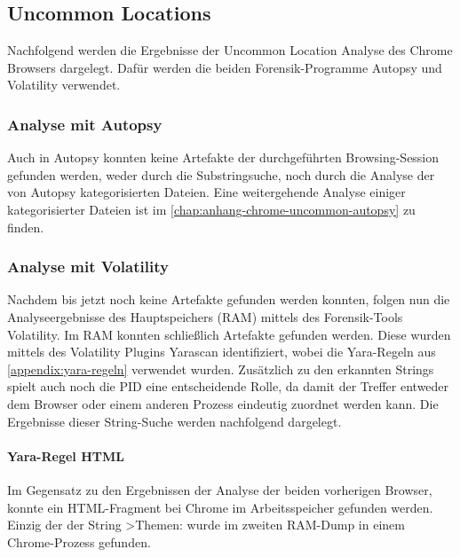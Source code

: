 \subsection*{Uncommon Locations}\label{chap:ergebnisse-chrome-uncommon-locations}

Nachfolgend werden die Ergebnisse der Uncommon Location Analyse des Chrome Browsers dargelegt. Dafür werden die beiden Forensik-Programme Autopsy und Volatility verwendet.

\subsubsection*{Analyse mit Autopsy}\label{chap:ergebnisse-chrome-uncommon-autopsy}

Auch in Autopsy konnten keine Artefakte der durchgeführten Browsing-Session gefunden werden, weder durch die Substringsuche, noch durch die Analyse der von Autopsy kategorisierten Dateien. Eine weitergehende Analyse einiger kategorisierter Dateien ist im \autoref{chap:anhang-chrome-uncommon-autopsy} zu finden.

\subsubsection*{Analyse mit Volatility}\label{chap:ergebnisse-chrome-uncommon-volatility}

Nachdem bis jetzt noch keine Artefakte gefunden werden konnten, folgen nun die Analyseergebnisse des Hauptspeichers (RAM) mittels des Forensik-Tools Volatility. Im RAM konnten schließlich Artefakte gefunden werden. Diese wurden mittels des Volatility Plugins Yarascan identifiziert, wobei die Yara-Regeln aus \autoref{appendix:yara-regeln} verwendet wurden. Zusätzlich zu den erkannten Strings spielt auch noch die PID eine entscheidende Rolle, da damit der Treffer entweder dem Browser oder einem anderen Prozess eindeutig zuordnet werden kann. Die Ergebnisse dieser String-Suche werden nachfolgend dargelegt.

\paragraph*{Yara-Regel \glqq{}HTML\grqq{}}\label{chap:ergebnisse-chrome-uncommon-volatility-html}

Im Gegensatz zu den Ergebnissen der Analyse der beiden vorherigen Browser, konnte ein HTML-Fragment bei Chrome im Arbeitsspeicher gefunden werden. Einzig der der String \glqq{}>Themen:\grqq{} wurde im zweiten RAM-Dump in einem Chrome-Prozess gefunden.

